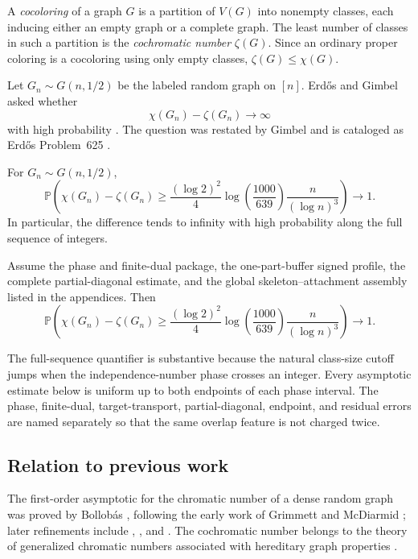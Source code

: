 A \emph{cocoloring} of a graph $G$ is a partition of $V(G)$ into nonempty
classes, each inducing either an empty graph or a complete graph. The least
number of classes in such a partition is the \emph{cochromatic number}
$\zeta(G)$. Since an ordinary proper coloring is a cocoloring using only empty
classes, $\zeta(G)\le\chi(G)$.

Let $G_n\sim G(n,1/2)$ be the labeled random graph on $[n]$. Erd\H{o}s and
Gimbel asked whether
\[
  \chi(G_n)-\zeta(G_n)\longrightarrow\infty
\]
with high probability \citep[p.~263]{erdos-gimbel-1993}. The question was
restated by Gimbel \citep[Section~7.4]{gimbel-2016} and is cataloged as
Erd\H{o}s Problem~625 \citep{bloom-erdos625}.

\ifErdosProofClosed
\begin{maintheorem}
For $G_n\sim G(n,1/2)$,
\[
  \mathbb P\!\left(
    \chi(G_n)-\zeta(G_n)
    \ge
    \frac{(\log 2)^2}{4}
    \log\!\left(\frac{1000}{639}\right)
    \frac{n}{(\log n)^3}
  \right)
  \longrightarrow1.
\]
In particular, the difference tends to infinity with high probability along
the full sequence of integers.
\end{maintheorem}
\else
\begin{maintheorem}
Assume the phase and finite-dual package, the one-part-buffer signed profile,
the complete partial-diagonal estimate, and the global
skeleton--attachment assembly listed in the appendices. Then
\[
  \mathbb P\!\left(
    \chi(G_n)-\zeta(G_n)
    \ge
    \frac{(\log 2)^2}{4}
    \log\!\left(\frac{1000}{639}\right)
    \frac{n}{(\log n)^3}
  \right)
  \longrightarrow1.
\]
\end{maintheorem}
\fi

The full-sequence quantifier is substantive because the natural class-size
cutoff jumps when the independence-number phase crosses an integer. Every
asymptotic estimate below is uniform up to both endpoints of each phase
interval. The phase, finite-dual, target-transport, partial-diagonal, endpoint,
and residual errors are named separately so that the same overlap feature is
not charged twice.

\subsection*{Relation to previous work}

The first-order asymptotic for the chromatic number of a dense random graph was
proved by Bollob\'as \citep{bollobas-1988}, following the early work of
Grimmett and McDiarmid \citep{grimmett-mcdiarmid-1975}; later refinements
include \citet{mcdiarmid-1990}, \citet{panagiotou-steger-2009}, and
\citet{heckel-2018}. The cochromatic number belongs to the theory of generalized
chromatic numbers associated with hereditary graph properties
\citep{scheinerman-1992,bollobas-thomason-1995}.

